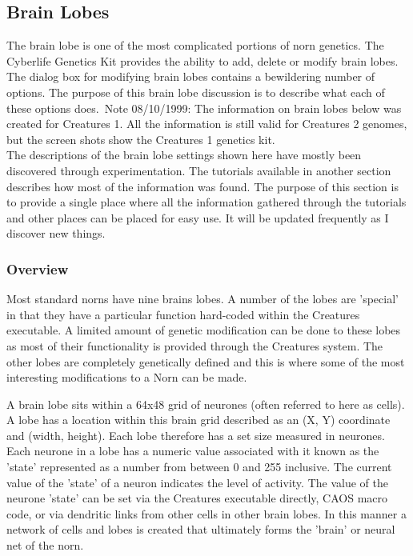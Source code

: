\documentclass[11pt,twoside,a4paper]{article}
\begin{document}

\subsection{Brain Lobes} %

The brain lobe is one of the most complicated portions of norn genetics. The Cyberlife Genetics Kit provides the ability to add, delete or modify brain lobes. The dialog box for modifying brain lobes contains a bewildering number of options. The purpose of this brain lobe discussion is to describe what each of these options does.~\footnotesize{Note 08/10/1999: The information on brain lobes below was created for Creatures 1. All the information is still valid for Creatures 2 genomes, but the screen shots show the Creatures 1 genetics kit.}~\normalsize{}~\\


The descriptions of the brain lobe settings shown here have mostly been discovered through experimentation. The tutorials available in another section  describes how most of the information was found. The purpose of this section is to provide a single place where all the information gathered through the tutorials and other places can be placed for easy use. It will be updated frequently as I discover new things.

\subsubsection{Overview}

Most standard norns have nine brains lobes. A number of the lobes are 'special' in that they have a particular function hard-coded within the Creatures executable. A limited amount of genetic modification can be done to these lobes as most of their functionality is provided through the Creatures system. The other lobes are completely genetically defined and this is where some of the most interesting modifications to a Norn can be made.~\\

\clearpage

A brain lobe sits within a 64x48 grid of neurones (often referred to here as cells). A lobe has a location within this brain grid described as an (X, Y) coordinate and (width, height). Each lobe therefore has a set size measured in neurones. Each neurone in a lobe has a numeric value associated with it known as the 'state' represented as a number from between 0 and 255 inclusive. The current value of the 'state' of a neuron indicates the level of activity. The value of the neurone 'state' can be set via the Creatures executable directly, CAOS macro code, or via dendritic links from other cells in other brain lobes. In this manner a network of cells and lobes is created that ultimately forms the 'brain' or neural net of the norn.~\\
\end{document}
